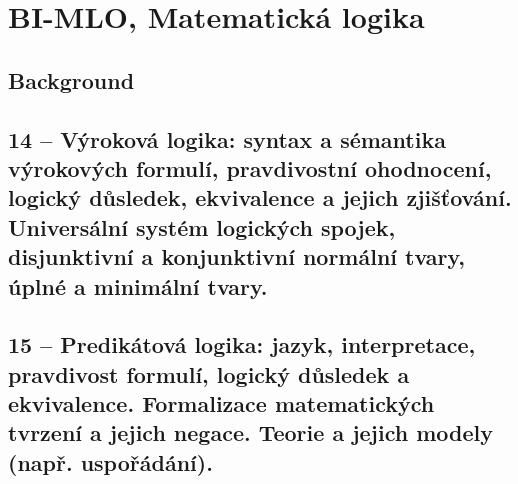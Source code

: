 \chapter{BI-MLO, Matematická logika}

\section{Background}

\section{14 -- Výroková logika: syntax a sémantika výrokových formulí, pravdivostní ohodnocení, logický důsledek, ekvivalence a jejich zjišťování. Universální systém logických spojek, disjunktivní a konjunktivní normální tvary, úplné a minimální tvary.}

\section{15 -- Predikátová logika: jazyk, interpretace, pravdivost formulí, logický důsledek a ekvivalence. Formalizace matematických tvrzení a jejich negace. Teorie a jejich modely (např. uspořádání).}
